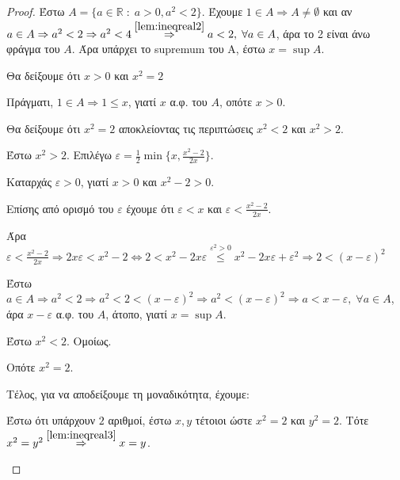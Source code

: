 \documentclass[main.tex]{subfiles}
\begin{document}

\begin{proof}
\item {}
    Έστω $ A = \{ a \in \mathbb{R} \; : \; a > 0, a^{2} < 2 \}  $. Έχουμε $ 1 \in A 
    \Rightarrow A \neq \emptyset $ 
    και αν $ a \in A \Rightarrow a^{2} < 2 \Rightarrow a^{2} < 4
    \overset{\ref{lem:ineqreal2}}{\Rightarrow} a <2,\; \forall a \in A $, 
    άρα το 2 είναι άνω φράγμα του $A$. Άρα υπάρχει το supremum του Α, έστω 
    $ x = \sup A $. 

    Θα δείξουμε ότι $ x > 0 $ και $ x^{2} = 2 $

    Πράγματι, $ 1 \in A \Rightarrow 1 \leq x $, γιατί $x$ α.φ. του $A$, οπότε $ x >0 $.

    Θα δείξουμε ότι $ x^{2} = 2 $ αποκλείοντας τις περιπτώσεις $ x^{2} <2 $ και 
    $ x^{2} > 2 $.
    \begin{myitemize}
        \item Έστω $ x^{2} > 2 $. Επιλέγω $ \varepsilon = \frac{1}{2} \min \{ x, 
            \frac{x^{2}-2}{2x}\} $.

            Καταρχάς $ \varepsilon > 0 $, γιατί $ x>0 $ και $ x^{2} -2 >0 $. 

            Επίσης από ορισμό του $ \varepsilon $ έχουμε ότι  $\varepsilon < x $ και 
            $ \varepsilon < \frac{x^{2}-2}{2x}$. 

            Άρα $ \varepsilon < \frac{x^{2}-2}{2x} \Rightarrow 
            2x \varepsilon < x^{2} - 2 \Leftrightarrow 2 < x^{2} -2x \varepsilon 
            \overset{\varepsilon ^{2}>0}{\leq}
            x^{2} -2x \varepsilon + \varepsilon ^{2} \Rightarrow 2 
            < (x- \varepsilon )^{2}   $

            Έστω $ a \in A \Rightarrow a^{2} <2 \Rightarrow a^{2}<2< 
            (x- \varepsilon )^{2} \Rightarrow a^{2}< (x- \varepsilon )^{2} 
            \Rightarrow a < x- \varepsilon, \; \forall a \in A$, 
            άρα $ x - \varepsilon $ α.φ. του $A$, άτοπο, γιατί $ x= \sup A $.

        \item Έστω $ x^{2}<2 $. Ομοίως.

            Οπότε $ x^{2}=2 $. 

            Τέλος, για να αποδείξουμε τη μοναδικότητα, έχουμε:

            Έστω ότι υπάρχουν $ 2 $ αριθμοί, έστω $ x,y $ τέτοιοι ώστε $ x^{2} =2 $ 
            και $ y^{2}=2 $. Τότε $ x^{2}=y^{2} \overset{\ref{lem:ineqreal3}}
            {\Rightarrow} x =y $.
    \end{myitemize}
\end{proof}
\end{document}
